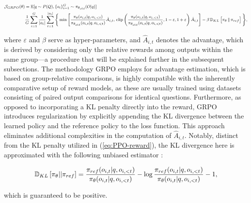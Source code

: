 \begin{itemize}[topsep=0pt]
\begin{itemize}[topsep=0pt]
\begin{equation}
\footnotesize
\begin{split}
    \mathcal{J}_{GRPO}(\theta) &= \mathbb{E}{[q \sim P(Q), \{o_i\}_{i=1}^G \sim \pi_{\theta_{old}}(O|q)]}  \\
    & \frac{1}{G}\sum_{i=1}^G\frac{1}{|o_i|} \sum_{t=1}^{|o_i|} \Bigg\{ \min \Bigg[ \frac{\pi_\theta(o_{i,t} | q, o_{i,<t})}{\pi_{\theta_{old}}(o_{i,t} | q, o_{i,<t})} \hat{A}_{i,t},\, \text{clip} \left( \frac{\pi_\theta(o_{i,t} | q, o_{i,<t})}{\pi_{\theta_{old}}(o_{i,t} | q, o_{i,<t})}, 1 - \varepsilon, 1 + \varepsilon \right)  \hat{A}_{i,t} \Bigg] - \beta\, \mathbb{D}_{KL}\left[\pi_{\theta} \,\Vert\, \pi_{ref}\right]\Bigg\} ,
\end{split}
\label{eq:GRPO-obj}
\end{equation}

where $\varepsilon$ and $\beta$ serve as hyper-parameters, and $\hat{A}_{i,t}$ denotes the advantage, which is derived by considering only the relative rewards among outputs within the same group—a procedure that will be explained further in the subsequent subsections. The methodology GRPO employs for advantage estimation, which is based on group-relative comparisons, is highly compatible with the inherently comparative setup of reward models, as these are usually trained using datasets consisting of paired output comparisons for identical questions. Furthermore, as opposed to incorporating a KL penalty directly into the reward, GRPO introduces regularization by explicitly appending the KL divergence between the learned policy and the reference policy to the loss function. This approach eliminates additional complexities in the computation of $\hat{A}_{i,t}$. Notably, distinct from the KL penalty utilized in (\ref{eq:PPO-reward}), the KL divergence here is approximated with the following unbiased estimator \citep{kl_approx}:

\begin{equation}
\small
    \mathbb{D}_{KL}\left[\pi_{\theta} || \pi_{ref}\right] = \frac{\pi_{ref}(o_{i,t}|q,o_{i,<t})}{\pi_{\theta}(o_{i,t}|q,o_{i,<t})}- \log\frac{\pi_{ref}(o_{i,t}|q,o_{i,<t})}{\pi_{\theta}(o_{i,t}|q,o_{i,<t})} - 1,
\end{equation}

which is guaranteed to be positive.


\end{itemize}
\end{itemize}
